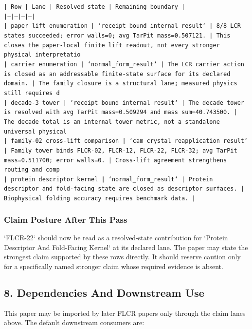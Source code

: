 \documentclass[11pt]{article}
\begin{document}
\noindent\texttt{| Row | Lane | Resolved state | Remaining boundary |}\\
\noindent\texttt{|---|---|---|---|}\\
\noindent\texttt{| paper lift enumeration | `receipt\_bound\_internal\_result` | 8/8 LCR states succeeded; error walls=0; avg TarPit mass=0.507121. | This closes the paper-local finite lift readout, not every stronger physical interpretatio}\\
\noindent\texttt{| carrier enumeration | `normal\_form\_result` | The LCR carrier action is closed as an addressable finite-state surface for its declared domain. | The family closure is a structural lane; measured physics still requires d}\\
\noindent\texttt{| decade-3 tower | `receipt\_bound\_internal\_result` | The decade tower is resolved with avg TarPit mass=0.509294 and mass sum=40.743500. | The decade total is an internal tower metric, not a standalone universal physical }\\
\noindent\texttt{| family-02 cross-lift comparison | `cam\_crystal\_reapplication\_result` | Family tower binds FLCR-02, FLCR-12, FLCR-22, FLCR-32; avg TarPit mass=0.511700; error walls=0. | Cross-lift agreement strengthens routing and comp}\\
\noindent\texttt{| protein descriptor kernel | `normal\_form\_result` | Protein descriptor and fold-facing state are closed as descriptor surfaces. | Biophysical folding accuracy requires benchmark data. |}\\

\subsubsection*{Claim Posture After This Pass}

`FLCR-22` should now be read as a resolved-state contribution for `Protein Descriptor And Fold-Facing Kernel` at its declared lane. The paper may state the strongest claim supported by these rows directly. It should reserve caution only for a specifically named stronger claim whose required evidence is absent.

\subsection*{8. Dependencies And Downstream Use}

This paper may be imported by later FLCR papers only through the claim lanes
above. The default downstream consumers are:
\end{document}
